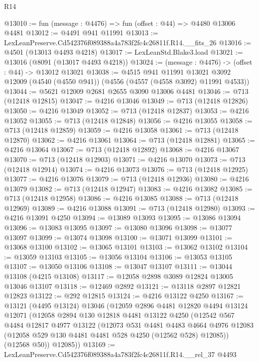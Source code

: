\begin{lexlean}{R14}
\begin{coremodule}
@13010 := fun (message : @4476) => fun (offset : @44) => @4480 @13006 @4481
@13012 := @4491 @941 @11991
@13013 := LexLeanPreserve.Cd542376f089388a4a783f2fc4c26811f.R14.__fits_26
@13016 := @4501 (@13013 @4493 @4218)
@13017 := LexLeanStd.Blake3.load
@13021 := @13016 (@8091 (@13017 @4493 @4218))
@13024 := (message : @4476) -> (offset : @44) -> @13012 @13021
@13038 := @4515
    @941
    @11991
    @13021
    @3092
    @12009
    (@4540 (@4550 @941))
    (@4556 (@4557 (@4558 @3092) @11991 @4533))
@13044 := @5621 @12009 @2681 @2655 @3090 @13006 @4481
@13046 := @713 (@12418 @12815)
@13047 := @4216 @13046
@13049 := @713 (@12418 @12826)
@13050 := @4216 @13049
@13052 := @713 (@12418 @12837)
@13053 := @4216 @13052
@13055 := @713 (@12418 @12848)
@13056 := @4216 @13055
@13058 := @713 (@12418 @12859)
@13059 := @4216 @13058
@13061 := @713 (@12418 @12870)
@13062 := @4216 @13061
@13064 := @713 (@12418 @12881)
@13065 := @4216 @13064
@13067 := @713 (@12418 @12892)
@13068 := @4216 @13067
@13070 := @713 (@12418 @12903)
@13071 := @4216 @13070
@13073 := @713 (@12418 @12914)
@13074 := @4216 @13073
@13076 := @713 (@12418 @12925)
@13077 := @4216 @13076
@13079 := @713 (@12418 @12936)
@13080 := @4216 @13079
@13082 := @713 (@12418 @12947)
@13083 := @4216 @13082
@13085 := @713 (@12418 @12958)
@13086 := @4216 @13085
@13088 := @713 (@12418 @12969)
@13089 := @4216 @13088
@13091 := @713 (@12418 @12980)
@13093 := @4216 @13091 @4250
@13094 := @13089 @13093
@13095 := @13086 @13094
@13096 := @13083 @13095
@13097 := @13080 @13096
@13098 := @13077 @13097
@13099 := @13074 @13098
@13100 := @13071 @13099
@13101 := @13068 @13100
@13102 := @13065 @13101
@13103 := @13062 @13102
@13104 := @13059 @13103
@13105 := @13056 @13104
@13106 := @13053 @13105
@13107 := @13050 @13106
@13108 := @13047 @13107
@13111 := @13044 @13108 (@4215 @13108)
@13117 := @12058 @2898 @3089 @12824 @13005 @13046 @13107
@13118 := @12469 @2892
@13121 := @13118 @2897 @12821 @12823
@13122 := @292 @12815
@13124 := @4216 @13122 @4250
@13167 := @13121
    (@4495 @13124)
    @13046
    (@12059
      @2896
      @4481
      @12820
      @4494
      @13124
      @12071
      (@12058
        @2894
        @130
        @12818
        @4481
        @13122
        @4250
        (@12542
          @567
          @4484
          @12817
          @4977
          @13122
          (@12073
            @531
            @4481
            @4483
            @4664
            @4976
            @12083
            (@12058 @529 @130 @4481 @4481 @528 @4250 (@12562 @528) @12085))
          (@12568 @50))
        @12085))
@13169 := LexLeanPreserve.Cd542376f089388a4a783f2fc4c26811f.R14.__rel_37 @4493

\end{coremodule}
\end{lexlean}
